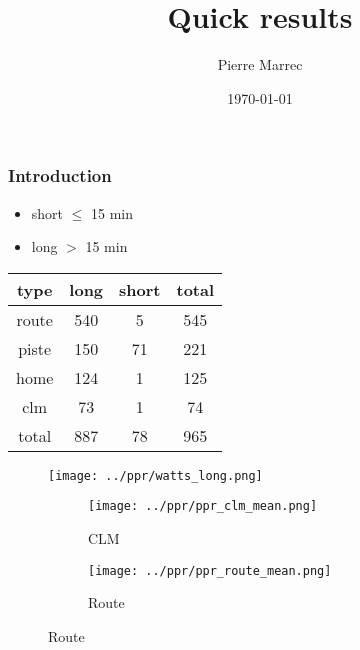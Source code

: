 \documentclass{beamer}
\begin{document}
\title{Quick results}
\author{Pierre Marrec}
\date{\today}

\begin{frame}
    \titlepage
\end{frame}

\begin{frame}
    \frametitle{Introduction}

\begin{itemize}
    \item short $\leq$ 15 min
    \item long $>$ 15 min
\end{itemize}
\begin{table}
    \centering
    \begin{tabular}{|c|c|c|c|}
        \hline
        type & long & short & total \\
        \hline
        route & 540 & 5 & 545 \\
        piste & 150 & 71 & 221 \\
        home & 124 & 1 & 125 \\
        clm & 73 & 1 & 74 \\
        total & 887 & 78 & 965 \\
        \hline
    \end{tabular}
\end{table}

\end{frame}





\begin{frame}
    \begin{figure}
        \texttt{[image: ../ppr/watts\_long.png]}
    \end{figure}
\end{frame}

\begin{frame}
    \begin{figure}
        \begin{subfigure}{0.7\textwidth}
            \centering
            \texttt{[image: ../ppr/ppr\_clm\_mean.png]}
            \caption{CLM}
        \end{subfigure}
        \begin{subfigure}{0.7\textwidth}
            \centering
            \texttt{[image: ../ppr/ppr\_route\_mean.png]}
            \caption{Route}
        \end{subfigure}
    \end{figure}
\end{frame}
\end{document}
